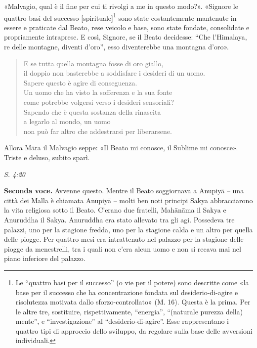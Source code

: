 «Malvagio, qual è il fine per cui ti rivolgi a me in questo modo?».
«Signore le quattro basi del successo [spirituale]\footnote{Le “quattro basi per il successo” (o vie per il potere) sono descritte come «la base per il successo che ha concentrazione fondata sul desiderio-di-agire e risolutezza motivata dallo sforzo-controllato» (M. 16). Questa è la prima. Per le altre tre, sostituire, rispettivamente, “energia”, “(naturale purezza della) mente”, e “investigazione” al “desiderio-di-agire”. Esse rappresentano i quattro tipi di approccio dello sviluppo, da regolare sulla base delle avversioni individuali.} sono state costantemente mantenute
in essere e praticate dal Beato, rese
veicolo e base, sono state fondate, consolidate e propriamente
intraprese. E così, Signore, se il Beato decidesse: “Che l’Himalaya, re
delle montagne, diventi d’oro”, esso diventerebbe una montagna d’oro».


\begin{quotation}
E se tutta quella montagna fosse di oro giallo, \\
il doppio non basterebbe a soddisfare i desideri di un uomo. \\
Sapere questo è agire di conseguenza. \\
Un uomo che ha visto la sofferenza e la sua fonte \\
come potrebbe volgersi verso i desideri sensoriali? \\
Sapendo che è questa sostanza della rinascita \\
a legarlo al mondo, un uomo \\
non può far altro che addestrarsi per liberarsene.
\end{quotation}

Allora Māra il Malvagio seppe: «Il Beato mi conosce, il Sublime mi
conosce». Triste e deluso, subito sparì.


\emph{S. 4:20}


\textbf{Seconda voce.} Avvenne questo. Mentre il Beato soggiornava a Anupiyā –
una città dei Malla è chiamata Anupiyā – molti ben noti principi Sakya
abbracciarono la vita religiosa sotto il Beato. C’erano due fratelli,
Mahānāma il Sakya e Anuruddha il Sakya. Anuruddha era stato allevato tra
gli agi. Possedeva tre palazzi, uno per la stagione fredda, uno per la
stagione calda e un altro per quella delle piogge. Per quattro mesi era
intrattenuto nel palazzo per la stagione delle piogge da menestrelli,
tra i quali non c’era alcun uomo e non si recava mai nel piano inferiore
del palazzo.


